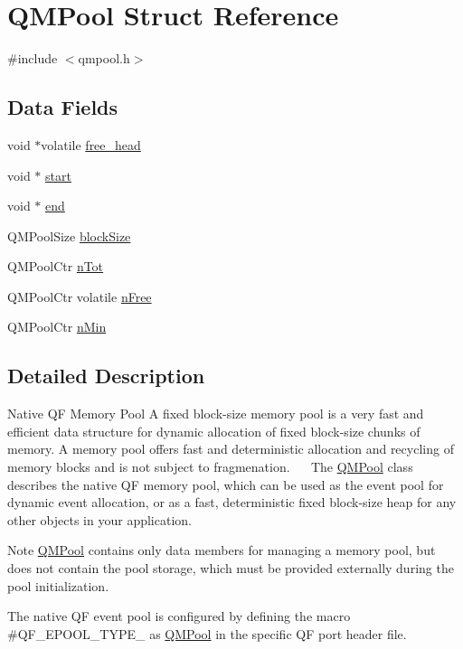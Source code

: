 \hypertarget{structQMPool}{}\section{Q\+M\+Pool Struct Reference}
\label{structQMPool}


{\ttfamily \#include $<$qmpool.\+h$>$}

\subsection*{Data Fields}
\begin{DoxyCompactItemize}
\item 
void $\ast$volatile \hyperlink{structQMPool_a5e8248b793788b181c1a13c39f2100c2}{free\+\_\+head}
\item 
void $\ast$ \hyperlink{structQMPool_ad0834404a27a4260898e927fd1e03925}{start}
\item 
void $\ast$ \hyperlink{structQMPool_a7e03b2b1de179b9ad5e618d0622521fc}{end}
\item 
Q\+M\+Pool\+Size \hyperlink{structQMPool_afa43a09e05f8e8820e90c51e5b86d3e2}{block\+Size}
\item 
Q\+M\+Pool\+Ctr \hyperlink{structQMPool_a429751e99a581e4fd21665b0cc58a225}{n\+Tot}
\item 
Q\+M\+Pool\+Ctr volatile \hyperlink{structQMPool_a9078988aa441f41305a142aec0187f55}{n\+Free}
\item 
Q\+M\+Pool\+Ctr \hyperlink{structQMPool_aebecbafcf2b06319016b737d0bf6337f}{n\+Min}
\end{DoxyCompactItemize}


\subsection{Detailed Description}
Native QF Memory Pool  A fixed block-\/size memory pool is a very fast and efficient data structure for dynamic allocation of fixed block-\/size chunks of memory. A memory pool offers fast and deterministic allocation and recycling of memory blocks and is not subject to fragmenation.~\newline
~\newline
The \hyperlink{structQMPool}{Q\+M\+Pool} class describes the native QF memory pool, which can be used as the event pool for dynamic event allocation, or as a fast, deterministic fixed block-\/size heap for any other objects in your application.

\begin{DoxyNote}{Note}
\hyperlink{structQMPool}{Q\+M\+Pool} contains only data members for managing a memory pool, but does not contain the pool storage, which must be provided externally during the pool initialization.

The native QF event pool is configured by defining the macro \#\+Q\+F\+\_\+\+E\+P\+O\+O\+L\+\_\+\+T\+Y\+P\+E\+\_\+ as \hyperlink{structQMPool}{Q\+M\+Pool} in the specific QF port header file. 
\end{DoxyNote}


